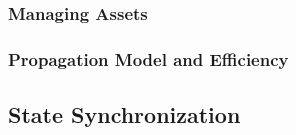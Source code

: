 \documentclass{sigchi}
\begin{document}



\subsubsection{Managing Assets}


\subsubsection{Propagation Model and Efficiency}




\subsection{State Synchronization}
\label{statesync}
\end{document}

